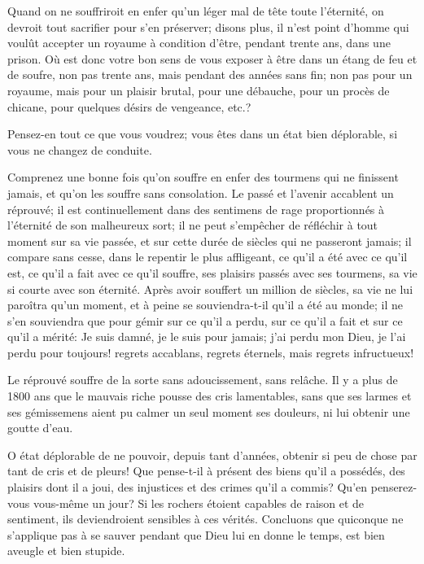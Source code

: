 \documentclass[instructions.tex]{subfiles}
\begin{document}
Quand on ne souffriroit en enfer qu’un léger mal de tête toute l’éternité, on devroit tout sacrifier pour s’en préserver; disons plus, il n’est point d’homme qui voulût accepter un royaume à condition d’être, pendant trente ans, dans une prison. Où est donc votre bon sens de vous exposer à être dans un étang de feu et de soufre, non pas trente ans, mais pendant des années sans fin; non pas pour un royaume, mais pour un plaisir brutal, pour une débauche, pour un procès de chicane, pour quelques désirs de vengeance, etc.?
 
Pensez-en tout ce que vous voudrez; vous êtes dans un état bien déplorable, si vous ne changez de conduite.
 
\secundo Comprenez une bonne fois qu’on souffre en enfer des tourmens qui ne finissent jamais, et qu’on les souffre sans consolation. Le passé et l’avenir accablent un réprouvé; il est continuellement dans des sentimens de rage proportionnés à l’éternité de son malheureux sort; il ne peut s’empêcher de réfléchir à tout moment sur sa vie passée, et sur cette durée de siècles qui ne passeront jamais; il compare sans cesse, dans le repentir le plus affligeant, ce qu’il a été avec ce qu’il est, ce qu’il a fait avec ce qu’il souffre, ses plaisirs passés avec ses tourmens, sa vie si courte avec son éternité. Après avoir souffert un million de siècles, sa vie ne lui paroîtra qu’un moment, et à peine se souviendra-t-il qu’il a été au monde; il ne s’en souviendra que pour gémir sur ce qu’il a perdu, sur ce qu’il a fait et sur ce qu’il a mérité: Je suis damné, je le suis pour jamais; j’ai perdu mon Dieu, je l’ai perdu pour toujours! regrets accablans, regrets éternels, mais regrets infructueux!
 
\tertio Le réprouvé souffre de la sorte sans adoucissement, sans relâche. Il y a plus de 1800 ans que le mauvais riche pousse des cris lamentables, sans que ses larmes et ses gémissemens aient pu calmer un seul moment ses douleurs, ni lui obtenir une goutte d’eau.
 
O état déplorable de ne pouvoir, depuis tant d’années, obtenir si peu de chose par tant de cris et de pleurs! Que pense-t-il à présent des biens qu’il a possédés, des plaisirs dont il a joui, des injustices et des crimes qu’il a commis? Qu’en penserez-vous vous-même un jour? Si les rochers étoient capables de raison et de sentiment, ils deviendroient sensibles à ces vérités. Concluons que quiconque ne s’applique pas à se sauver pendant que Dieu lui en donne le temps, est bien aveugle et bien stupide.
 
\end{document}
